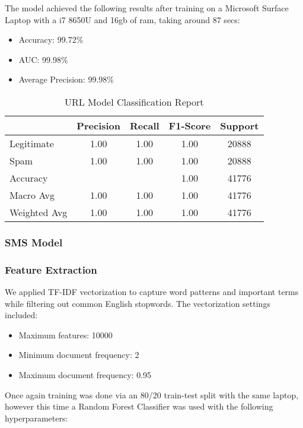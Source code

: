 \documentclass{article}
\begin{document}
\noindent
The model achieved the following results after training on a Microsoft Surface Laptop with a i7 8650U and 16gb of ram, taking around 87 secs:

\begin{itemize}
    \item Accuracy: 99.72\%
    \item AUC: 99.98\%
    \item Average Precision: 99.98\%
\end{itemize} 


\begin{table}[htbp]
    \centering
    \caption{URL Model Classification Report}
    \begin{tabular}{l c c c c}
    \toprule
     & Precision & Recall & F1-Score & Support \\
    \midrule
    Legitimate & 1.00 & 1.00 & 1.00 & 20888 \\
    Spam & 1.00 & 1.00 & 1.00 & 20888 \\
    \midrule
    Accuracy & & & 1.00 & 41776 \\
    Macro Avg & 1.00 & 1.00 & 1.00 & 41776 \\
    Weighted Avg & 1.00 & 1.00 & 1.00 & 41776 \\
    \bottomrule
    \end{tabular}
    \label{tab:classification_report}
\end{table}

\subsubsection{SMS Model}
\subsubsection*{Feature Extraction}

We applied TF-IDF vectorization to capture word patterns and important terms while filtering out common English stopwords. The vectorization settings included:

\begin{itemize}
    \item Maximum features: 10000
    \item Minimum document frequency: 2
    \item Maximum document frequency: 0.95
\end{itemize}

\noindent
Once again training was done via an 80/20 train-test split with the same laptop, however this time a Random Forest Classifier was used with the following hyperparameters:
\end{document}
